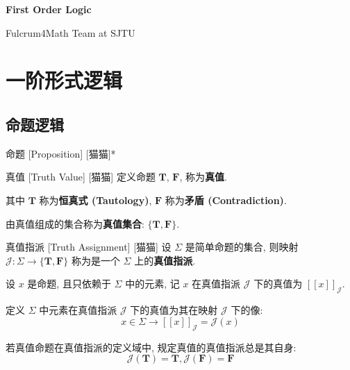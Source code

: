 \documentclass[UTF8]{ctexart}
\newcommand{\LT}{\ensuremath{\mathbf{T}}}
\newcommand{\LF}{\ensuremath{\mathbf{F}}}
\newcommand{\assign}[2]{\ensuremath{{[\![#1]\!]}_{#2}}}
\begin{document}
    \begin{center}
        {\LARGE\textbf{First Order Logic}}

        Fulcrum4Math Team at SJTU
    \end{center}

    \section{一阶形式逻辑}

        \subsection{命题逻辑}

            \begin{dfn}
                [Proposition]
                {命题}
                [Proposition]
                [猫猫]*
            \end{dfn}

            \begin{dfn}
                {真值}
                [Truth Value]
                [猫猫]
                定义命题 \(\LT\), \(\LF\), 称为\textbf{真值}. 

                其中 \(\LT\) 称为\textbf{恒真式 (Tautology)}, \(\LF\) 称为\textbf{矛盾 (Contradiction)}. 

                由真值组成的集合称为\textbf{真值集合}: \(\{\LT,\LF\}\). 
            \end{dfn}

            \begin{dfn}
                {真值指派}
                [Truth Assignment]
                [猫猫]
                设 \(\Sigma\) 是简单命题的集合, 则映射 \(\mathcal{J}:\Sigma\to\{\LT,\LF\}\) 称为是一个 \(\Sigma\) 上的\textbf{真值指派}. 

                设 \(x\) 是命题, 且只依赖于 \(\Sigma\) 中的元素, 记 \(x\) 在真值指派 \(\mathcal{J}\) 下的真值为 \(\assign{x}{\mathcal{J}}\). 

                定义 \(\Sigma\) 中元素在真值指派 \(\mathcal{J}\) 下的真值为其在映射 \(\mathcal{J}\) 下的像: 
                \[x\in\Sigma\to\assign{x}{\mathcal{J}}=\mathcal{J}(x)\]
                
                若真值命题在真值指派的定义域中, 规定真值的真值指派总是其自身: 
                \[\mathcal{J}(\LT)=\LT, \mathcal{J}(\LF)=\LF\]
            \end{dfn}
\end{document}
